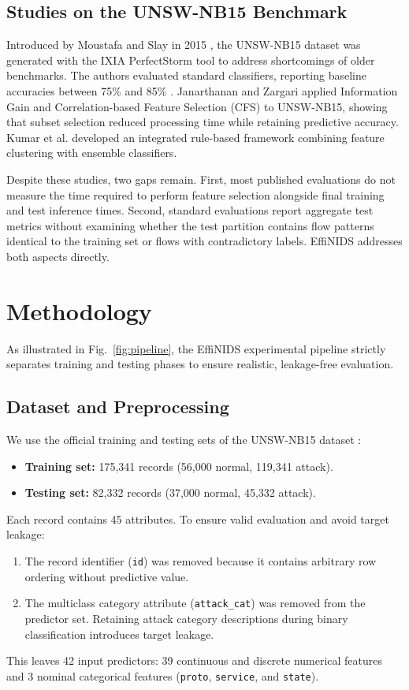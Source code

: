 \documentclass[conference]{IEEEtran}
\begin{document}
\subsection{Studies on the UNSW-NB15 Benchmark}
Introduced by Moustafa and Slay in 2015 \cite{moustafa2015unsw}, the UNSW-NB15 dataset was generated with the IXIA PerfectStorm tool to address shortcomings of older benchmarks. The authors evaluated standard classifiers, reporting baseline accuracies between 75\% and 85\% \cite{moustafa2016evaluation}. Janarthanan and Zargari \cite{janarthanan2017feature} applied Information Gain and Correlation-based Feature Selection (CFS) to UNSW-NB15, showing that subset selection reduced processing time while retaining predictive accuracy. Kumar et al. \cite{kumar2020integrated} developed an integrated rule-based framework combining feature clustering with ensemble classifiers.

Despite these studies, two gaps remain. First, most published evaluations do not measure the time required to perform feature selection alongside final training and test inference times. Second, standard evaluations report aggregate test metrics without examining whether the test partition contains flow patterns identical to the training set or flows with contradictory labels. EffiNIDS addresses both aspects directly.

\section{Methodology}
As illustrated in Fig.~\ref{fig:pipeline}, the EffiNIDS experimental pipeline strictly separates training and testing phases to ensure realistic, leakage-free evaluation.

\subsection{Dataset and Preprocessing}
We use the official training and testing sets of the UNSW-NB15 dataset \cite{moustafa2015unsw}:
\begin{itemize}
    \item \textbf{Training set:} 175,341 records (56,000 normal, 119,341 attack).
    \item \textbf{Testing set:} 82,332 records (37,000 normal, 45,332 attack).
\end{itemize}
Each record contains 45 attributes. To ensure valid evaluation and avoid target leakage:
\begin{enumerate}
    \item The record identifier (\texttt{id}) was removed because it contains arbitrary row ordering without predictive value.
    \item The multiclass category attribute (\texttt{attack\_cat}) was removed from the predictor set. Retaining attack category descriptions during binary classification introduces target leakage.
\end{enumerate}
This leaves 42 input predictors: 39 continuous and discrete numerical features and 3 nominal categorical features (\texttt{proto}, \texttt{service}, and \texttt{state}).
\end{document}
